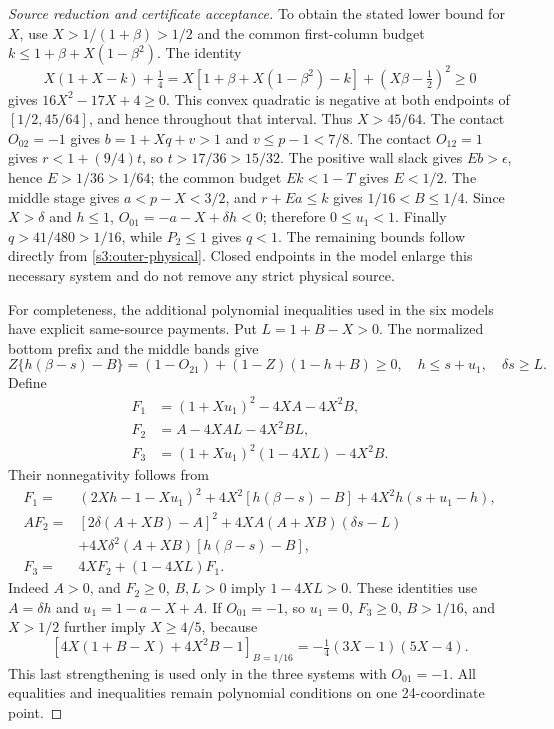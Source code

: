 \documentclass[11pt,reqno]{amsart}
\theoremstyle{definition}
\theoremstyle{remark}
\begin{document}
\begin{proof}[Source reduction and certificate acceptance]
To obtain the stated lower bound for \(X\), use
\(X>1/(1+\beta)>1/2\) and the common first-column budget
\(k\le1+\beta+X(1-\beta^2)\). The identity
\[
 X(1+X-k)+\tfrac14
 =X[1+\beta+X(1-\beta^2)-k]+(X\beta-\tfrac12)^2
 \ge0
\]
gives \(16X^2-17X+4\ge0\). This convex quadratic is
negative at both endpoints of \([1/2,45/64]\), and hence throughout
that interval. Thus \(X>45/64\).
The contact \(O_{02}=-1\) gives
\(b=1+Xq+v>1\) and \(v\le p-1<7/8\).
The contact \(O_{12}=1\) gives
\(r<1+(9/4)t\), so \(t>17/36>15/32\).
The positive wall slack gives \(Eb>\epsilon\), hence
\(E>1/36>1/64\); the common budget \(Ek<1-T\)
gives \(E<1/2\). The middle stage gives
\(a<p-X<3/2\), and \(r+Ea\le k\) gives
\(1/16<B\le1/4\). Since \(X>\delta\) and \(h\le1\),
\(O_{01}=-a-X+\delta h<0\); therefore \(0\le u_1<1\).
Finally \(q>41/480>1/16\), while \(P_2\le1\) gives
\(q<1\). The remaining bounds follow directly from
\eqref{s3:outer-physical}. Closed endpoints in the model enlarge
this necessary system and do not remove any strict physical source.

For completeness, the additional polynomial inequalities used in the
six models have explicit same-source payments. Put
\(L=1+B-X>0\). The normalized bottom prefix and the middle bands give
\[
 Z\{h(\beta-s)-B\}
  =(1-O_{21})+(1-Z)(1-h+B)\ge0,
 \quad h\le s+u_1,\quad \delta s\ge L.
\]
Define
\[
 \begin{split}
 F_1&=(1+Xu_1)^2-4XA-4X^2B,\\
 F_2&=A-4XAL-4X^2BL,\\
 F_3&=(1+Xu_1)^2(1-4XL)-4X^2B.
 \end{split}
\]
Their nonnegativity follows from
\[
 \begin{split}
 F_1={}&(2Xh-1-Xu_1)^2
       +4X^2[h(\beta-s)-B]+4X^2h(s+u_1-h),\\
 AF_2={}&[2\delta(A+XB)-A]^2
       +4XA(A+XB)(\delta s-L)\\
       &+4X\delta^2(A+XB)[h(\beta-s)-B],\\
 F_3={}&4XF_2+(1-4XL)F_1.
 \end{split}
\]
Indeed \(A>0\), and \(F_2\ge0\), \(B,L>0\) imply
\(1-4XL>0\). These identities use \(A=\delta h\) and
\(u_1=1-a-X+A\). If \(O_{01}=-1\), so \(u_1=0\),
\(F_3\ge0\), \(B>1/16\), and \(X>1/2\) further imply
\(X\ge4/5\), because
\[
 [4X(1+B-X)+4X^2B-1]_{B=1/16}
 =-\tfrac14(3X-1)(5X-4).
\]
This last strengthening is used only in the three systems with
\(O_{01}=-1\). All equalities and inequalities remain polynomial
conditions on one 24-coordinate point.


\end{proof}
\end{document}
